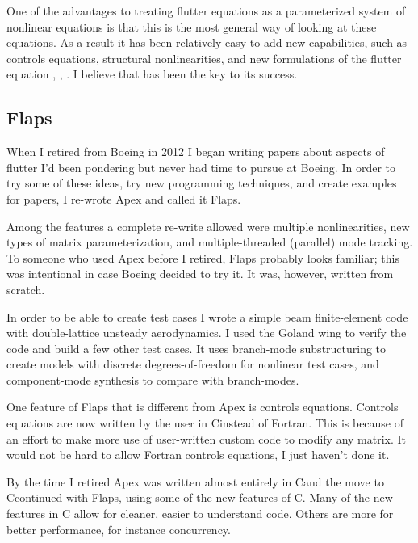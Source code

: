 \documentclass[11pt,openany,twoside]{book}
\numberwithin{equation}{section}		%
\def\Cpp{{C\nolinebreak[4]\hspace{-.05em}\raisebox{.4ex}{\tiny\bf ++}}\:}
\begin{document}
One of the advantages to treating flutter equations as a parameterized
system of nonlinear equations is that this is the most general way of
looking at these equations.
As a result it has been relatively easy to add new capabilities, such as
controls equations, structural nonlinearities, and new formulations of the flutter
equation
\cite{hassig1971approximate},
\cite{chen2000damping}, \cite{edwards2008flutter}.
I believe that has been the key to its success.

\subsection{Flaps}
When I retired from Boeing in 2012 I began writing papers about
aspects of flutter I'd been pondering but never had time to pursue
at Boeing. In order to try some of these ideas, try new
programming techniques, and create examples for papers, I re-wrote Apex
and called it Flaps.

Among the features a complete re-write allowed were multiple nonlinearities,
new types of matrix parameterization, and multiple-threaded
(parallel) mode tracking.
To someone who used Apex before I retired, Flaps probably
looks familiar; this was intentional in case Boeing decided to try it.
It was, however, written from scratch.

In order to be able to create test cases I wrote a simple beam
finite-element code with double-lattice unsteady aerodynamics. I used
the Goland wing to verify the code and build a few other test cases.
It uses branch-mode substructuring to create models with discrete
degrees-of-freedom for nonlinear test cases, and component-mode
synthesis to compare with branch-modes.

One feature of Flaps that is different from Apex is controls equations.
Controls equations are now written by the user in \Cpp instead of
Fortran. This is because of an effort to make more use of user-written
custom code to modify any matrix. It would not be hard to allow
Fortran controls equations, I just haven't done it.


By the time I retired Apex was written almost entirely in \Cpp and
the move to \Cpp continued with Flaps, using some of the new features
of \Cpp -11.
Many of the new features in \Cpp -11 allow for cleaner, easier to
understand code. Others are more for better performance, for instance
concurrency.
\end{document}
